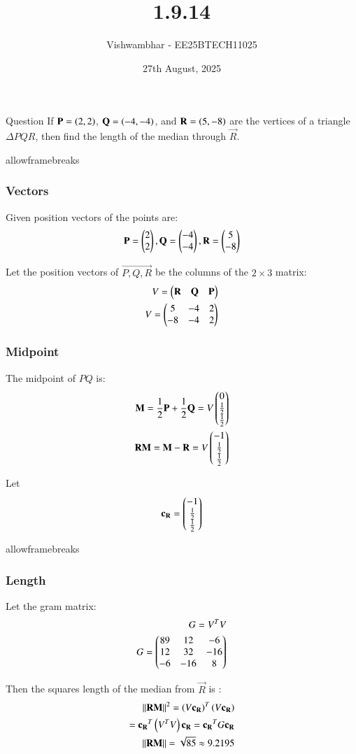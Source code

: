 \documentclass{beamer}
\title{1.9.14}
\date{27th August, 2025}
\author{Vishwambhar - EE25BTECH11025}
\begin{document}
\frame{\titlepage}
\begin{frame}{Question}
If $\mathbf{P}=\left(2,2\right)$, $\mathbf{Q}=\left(-4,-4\right)$, and $\mathbf{R}=\left(5,-8\right)$ are the vertices of a triangle $\Delta PQR$, then find the length of the median through $\vec{R}$.\\
\end{frame}

\begin{frame}{allowframebreaks}
\frametitle{Vectors}
Given position vectors of the points are:
\begin{align}
    \mathbf{P}=\begin{pmatrix}2\\2\end{pmatrix},
    \mathbf{Q}=\begin{pmatrix}-4\\-4\end{pmatrix},
    \mathbf{R}=\begin{pmatrix}5\\-8\end{pmatrix}
\end{align}

Let the position vectors of $\vec{P,Q,R}$ be the columns of the $2\times 3$ matrix:
\begin{align}
    V=\begin{pmatrix}\mathbf{R}&\mathbf{Q}&\mathbf{P}\end{pmatrix}\\
    V=\begin{pmatrix}5&-4&2\\-8&-4&2\end{pmatrix}
\end{align}
\end{frame}

\begin{frame}[fragile]
\frametitle{Midpoint}
The midpoint of $PQ$ is:
\begin{align}
    \mathbf{M}=\frac{1}{2}\mathbf{P}+\frac{1}{2}\mathbf{Q}=V\begin{pmatrix}0\\ \frac{1}{2}\\ \frac{1}{2}\end{pmatrix}\\
    \mathbf{RM}=\mathbf{M}-\mathbf{R}=V\begin{pmatrix}-1\\ \frac{1}{2}\\ \frac{1}{2}\end{pmatrix}
\end{align}

Let
\begin{align}
    \mathbf{c_R}=\begin{pmatrix}-1\\ \frac{1}{2}\\ \frac{1}{2}\end{pmatrix}
\end{align}
\end{frame}

\begin{frame}{allowframebreaks}
\frametitle{Length}
Let the gram matrix:
\begin{align}
G=V^TV\\
G=\begin{pmatrix}89&12&-6\\12&32&-16\\-6&-16&8\end{pmatrix}
\end{align}


Then the squares length of the median from $\vec{R}$ is :
\begin{align}
    ||\mathbf{RM}||^2=\left(V\mathbf{c_R}\right)^T\left(V\mathbf{c_R}\right)\\
    =\mathbf{c_R}^T\left(V^TV\right)\mathbf{c_R}=\mathbf{c_R}^TG\mathbf{c_R}\\
    ||\mathbf{RM}||= \sqrt{85}\approx9.2195
\end{align}
\end{frame}
\end{document}
